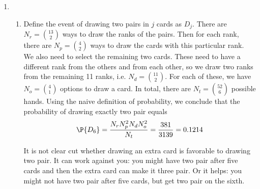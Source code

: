 \begin{exercise}
	\begin{solution}
		\begin{enumerate}
			\item 
			\begin{enumerate}
				\item Define the event of drawing two pairs in $j$ cards as $D_j$. There are $N_{r} = {13 \choose 2}$ ways to draw the ranks of the pairs. Then for each rank, there are $N_{p}={4 \choose 2}$ ways to draw the cards with this particular rank. We also need to select the remaining two cards. These need to have a different rank from the others and from each other, so we draw two ranks from the remaining 11 ranks, i.e. $N_{d} = {11 \choose 2}$. For each of these, we have $N_{o} = {4 \choose 1}$ options to draw a card. 
				In total, there are $N_{t} = {52 \choose 6}$ possible hands. Using the naive definition of probability, we conclude that the probability of drawing exactly two pair equals
				\begin{align*}
				\P{D_{6}} = \frac{N_{r}N_{p}^2 N_{d} N_{o}^2}{N_{t}} = \frac{381}{3139}=0.1214
				\end{align*} 
				
				
				It is not clear cut whether drawing an extra card is favorable to drawing two pair. It can work against you: you might have two pair after five cards and then the extra card can make it three pair. Or it helps: you might not have two pair after five cards, but get two pair on the sixth. 
				

\end{enumerate}
\end{enumerate}
\end{solution}
\end{exercise}
